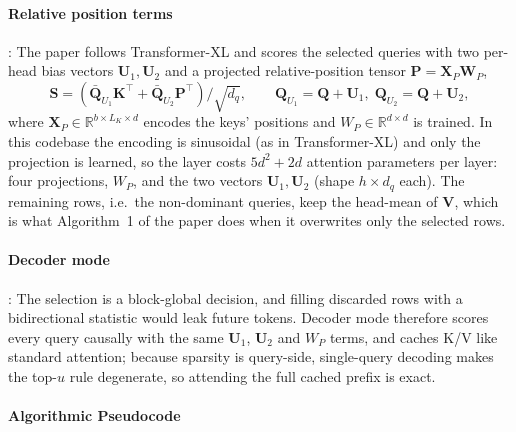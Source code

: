 \paragraph{Relative position terms}: The paper follows Transformer-XL and scores the selected queries with two per-head bias vectors $\mathbf{U}_1,\mathbf{U}_2$ and a projected relative-position tensor $\mathbf{P}=\mathbf{X}_P\mathbf{W}_P$,
\begin{equation}
\mathbf{S} = \left(\bar{\mathbf{Q}}_{U_1}\mathbf{K}^{\top} + \bar{\mathbf{Q}}_{U_2}\mathbf{P}^{\top}\right)/\sqrt{d_q},
\qquad
\mathbf{Q}_{U_1} = \mathbf{Q}+\mathbf{U}_1,\;
\mathbf{Q}_{U_2} = \mathbf{Q}+\mathbf{U}_2,
\end{equation}
where $\mathbf{X}_P\in\mathbb{R}^{b\times L_K\times d}$ encodes the keys' positions and $W_P\in\mathbb{R}^{d\times d}$ is trained. In this codebase the encoding is sinusoidal (as in Transformer-XL) and only the projection is learned, so the layer costs $5d^2+2d$ attention parameters per layer: four projections, $W_P$, and the two vectors $\mathbf{U}_1,\mathbf{U}_2$ (shape $h\times d_q$ each). The remaining rows, i.e.\ the non-dominant queries, keep the head-mean of $\mathbf{V}$, which is what Algorithm~1 of the paper does when it overwrites only the selected rows.

\paragraph{Decoder mode}: The selection is a block-global decision, and filling discarded rows with a bidirectional statistic would leak future tokens. Decoder mode therefore scores every query causally with the same $\mathbf{U}_1$, $\mathbf{U}_2$ and $W_P$ terms, and caches K/V like standard attention; because sparsity is query-side, single-query decoding makes the top-$u$ rule degenerate, so attending the full cached prefix is exact.

\paragraph{Algorithmic Pseudocode}

